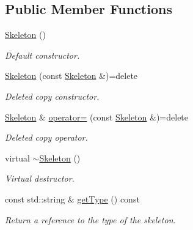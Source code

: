 \subsection*{Public Member Functions}
\begin{DoxyCompactItemize}
\item 
\mbox{\label{classassistive__rehab_1_1Skeleton_af01a02f1ce9ae4c801cd6e66ccf7407f}} 
\hyperlink{classassistive__rehab_1_1Skeleton_af01a02f1ce9ae4c801cd6e66ccf7407f}{Skeleton} ()
\begin{DoxyCompactList}\small\item\em Default constructor. \end{DoxyCompactList}\item 
\mbox{\label{classassistive__rehab_1_1Skeleton_a5bd61b69a0526271e7aa5de41e62200d}} 
\hyperlink{classassistive__rehab_1_1Skeleton_a5bd61b69a0526271e7aa5de41e62200d}{Skeleton} (const \hyperlink{classassistive__rehab_1_1Skeleton}{Skeleton} \&)=delete
\begin{DoxyCompactList}\small\item\em Deleted copy constructor. \end{DoxyCompactList}\item 
\mbox{\label{classassistive__rehab_1_1Skeleton_abedc3e06f870efa7e4b445606a0c1cde}} 
\hyperlink{classassistive__rehab_1_1Skeleton}{Skeleton} \& \hyperlink{classassistive__rehab_1_1Skeleton_abedc3e06f870efa7e4b445606a0c1cde}{operator=} (const \hyperlink{classassistive__rehab_1_1Skeleton}{Skeleton} \&)=delete
\begin{DoxyCompactList}\small\item\em Deleted copy operator. \end{DoxyCompactList}\item 
\mbox{\label{classassistive__rehab_1_1Skeleton_aeece886a4e2f039128144f94f25efd10}} 
virtual \hyperlink{classassistive__rehab_1_1Skeleton_aeece886a4e2f039128144f94f25efd10}{$\sim$\+Skeleton} ()
\begin{DoxyCompactList}\small\item\em Virtual destructor. \end{DoxyCompactList}\item 
const std\+::string \& \hyperlink{classassistive__rehab_1_1Skeleton_a4efc4844bd2b185f1080ee52ab69cb04}{get\+Type} () const
\begin{DoxyCompactList}\small\item\em Return a reference to the type of the skeleton. \end{DoxyCompactList}\item 

\end{DoxyCompactItemize}
